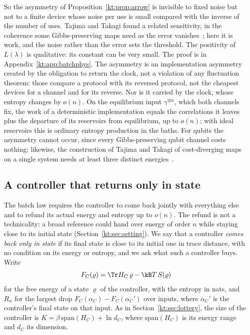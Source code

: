 So the asymmetry of Proposition~\ref{kt:prop:arrow} is invisible to fixed noise but not to a finite device whose noise per use is small compared with the inverse of the number of uses. Tajima and Takagi found a related sensitivity, in the coherence some Gibbs-preserving maps need as the error vanishes~\cite{TajimaTakagi25}; here it is work, and the noise rather than the error sets the threshold. The positivity of $L(\lambda)$ is qualitative: its constant can be very small. The proof is in Appendix~\ref{kt:app:batchphys}. The asymmetry is an implementation asymmetry created by the obligation to return the clock, not a violation of any fluctuation theorem: those compare a protocol with its reversed protocol, not the cheapest devices for a channel and for its reverse. Nor is it carried by the clock, whose entropy changes by $o(n)$. On the equilibrium input $\gamma^{\otimes n}$, which both channels fix, the work of a deterministic implementation equals the correlations it leaves plus the departure of its reservoirs from equilibrium, up to $o(n)$; with ideal reservoirs this is ordinary entropy production in the baths. For qubits the asymmetry cannot occur, since every Gibbs-preserving qubit channel costs nothing; likewise, the construction of Tajima and Takagi of cost-diverging maps on a single system needs at least three distinct energies~\cite{TajimaTakagi25}.

\subsection{A controller that returns only in state}\label{kt:sec:embezzle}

The batch law requires the controller to come back jointly with everything else and to refund its actual energy and entropy up to $o(n)$. The refund is not a technicality: a broad reference could hand over energy of order $n$ while staying close to its initial state (Section~\ref{kt:sec:setting}). We say that a controller \emph{comes back only in state} if its final state is close to its initial one in trace distance, with no condition on its energy or entropy, and we ask what such a controller buys. Write
\[
F_C(\varrho)=\Tr H_C\,\varrho-\kB T\,S(\varrho)
\]
for the free energy of a state $\varrho$ of the controller, with the entropy in nats, and $R_n$ for the largest drop $F_C(\alpha_C)-F_C(\alpha_C')$ over inputs, where $\alpha_C'$ is the controller's final state on that input. As in Section~\ref{kt:sec:lottery}, the size of the controller is $K=\beta\,\mathrm{span}(H_C)+\ln d_C$, where $\mathrm{span}(H_C)$ is its energy range and $d_C$ its dimension.


